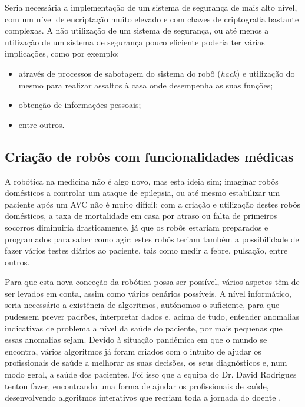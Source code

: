 \documentclass[10pt]{article}
\begin{document}
Seria necessária a implementação de um sistema de segurança de mais alto nível, com um nível de encriptação muito elevado e com chaves de criptografia bastante complexas. A não utilização de um sistema de segurança, ou até menos a utilização de um sistema de segurança pouco eficiente poderia ter várias implicações, como por exemplo:

\begin{itemize}
    \item através de processos de sabotagem do sistema do robô (\textit{hack}) e utilização do mesmo para realizar assaltos à casa onde desempenha as suas funções;
    \item obtenção de informações pessoais;
    \item entre outros.
\end{itemize}
    
\subsection{\textbf{Criação de robôs com funcionalidades médicas}}
\hspace{\parindent}A robótica na medicina não é algo novo, mas esta ideia sim; imaginar robôs domésticos a controlar um ataque de epilepsia, ou até mesmo estabilizar um paciente após um AVC não é muito difícil; com a criação e utilização destes robôs domésticos, a taxa de mortalidade em casa por atraso ou falta de primeiros socorros diminuiria drasticamente, já que os robôs estariam preparados e programados para saber como agir; estes robôs teriam também a possibilidade de fazer vários testes diários ao paciente, tais como medir a febre, pulsação, entre outros.

Para que esta nova conceção da robótica possa ser possível, vários aspetos têm de ser levados em conta, assim como vários cenários possíveis. A nível informático, seria necessário a existência de algoritmos, autónomos o suficiente, para que pudessem prever padrões, interpretar dados e, acima de tudo, entender anomalias indicativas de problema a nível da saúde do paciente, por mais pequenas que essas anomalias sejam. Devido à situação pandémica em que o mundo se encontra, vários algoritmos já foram criados com o intuito de ajudar os profissionais de saúde a melhorar as suas decisões, os seus diagnósticos e, num modo geral, a saúde dos pacientes. Foi isso que a equipa do Dr. David Rodrigues tentou fazer, encontrando uma forma de ajudar os profissionais de saúde, desenvolvendo algoritmos interativos que recriam toda a jornada do doente \cite{david-rod}.
\end{document}
